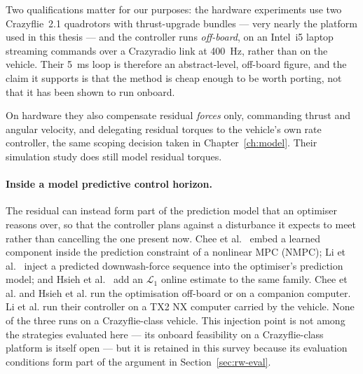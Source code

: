Two qualifications matter for our purposes: the hardware
experiments use two Crazyflie~2.1 quadrotors with thrust-upgrade bundles --- very nearly the
platform used in this thesis --- and the controller runs \emph{off-board}, on an Intel~i5 laptop
streaming commands over a Crazyradio link at \SI{400}{\hertz}, rather than on the vehicle. Their
\SI{5}{\milli\second} loop is therefore an abstract-level, off-board figure, and the claim it
supports is that the method is cheap enough to be worth porting, not that it has been shown to run
onboard.

On hardware they also compensate residual \emph{forces} only, commanding thrust and angular
velocity, and delegating residual torques to the vehicle's own rate controller, the same scoping
decision taken in Chapter~\ref{ch:model}. Their simulation study does still model residual torques.

\paragraph{Inside a model predictive control horizon.}
The residual can instead form part of the prediction model that an optimiser reasons over, so that
the controller plans against a disturbance it expects to meet rather than cancelling the one
present now. Chee et al.~\cite{chee2024knodedwmpc} embed a learned component inside the prediction
constraint of a nonlinear MPC (NMPC); Li et al.~\cite{li2023ndpnmpc} inject a predicted downwash-force
sequence into the optimiser's prediction model; and Hsieh et al.~\cite{hsieh2025onlineadaptation}
add an $\mathcal{L}_1$ online estimate to the same family. Chee et al. and Hsieh et al. run the
optimisation off-board or on a companion computer. Li et al. run their controller on a TX2 NX
computer carried by the vehicle. None of the three runs on a Crazyflie-class vehicle. This injection point is not among
the strategies evaluated here --- its onboard feasibility on a Crazyflie-class platform is itself
open --- but it is retained in this survey because its evaluation conditions form part of the
argument in Section~\ref{sec:rw-eval}.

